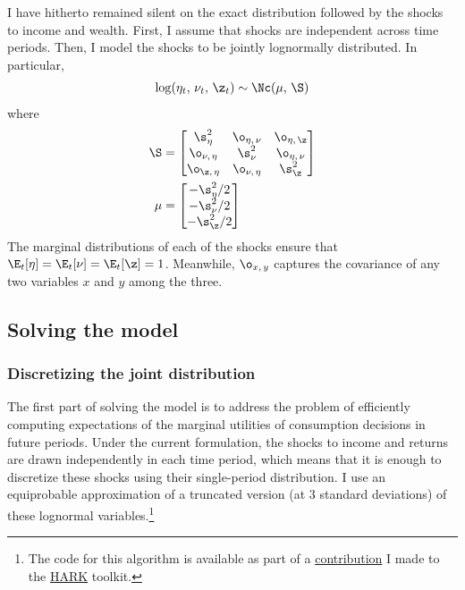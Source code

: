 I have hitherto remained silent on the exact distribution followed by the shocks to income and wealth. First, I assume that shocks are independent across time periods. Then, I model the shocks to be jointly lognormally distributed. In particular,
\begin{align*}
    \log (\eta_t,\,\nu_t,\,\z_t) \sim \Nc(\mu,\,\S)
\end{align*}
where
\begin{align*}
    \S &= \begin{bmatrix}
        \s_{\eta}^2 & \o_{\eta,\,\nu} & \o_{\eta,\,\z}\\
        \o_{\nu,\,\eta} & \s_{\nu}^2 & \o_{\eta,\,\nu}\\
        \o_{\z,\,\eta} & \o_{\nu,\,\eta} & \s_{\z}^2
    \end{bmatrix}\\
    \mu &= \begin{bmatrix}
        -\s_{\eta}^2 / 2\\
        -\s_{\nu}^2 / 2\\
        -\s_{\z}^2 / 2
    \end{bmatrix}
\end{align*}
The marginal distributions of each of the shocks ensure that $\E_t[\eta] = \E_t[\nu] = \E_t[\z] = 1$. Meanwhile, $\o_{x,\,y}$ captures the covariance of any two variables $x$ and $y$ among the three.

\subsection{Solving the model}

\subsubsection{Discretizing the joint distribution}\label{discretization}

The first part of solving the model is to address the problem of efficiently computing expectations of the marginal utilities of consumption decisions in future periods. Under the current formulation, the shocks to income and returns are drawn independently in each time period, which means that it is enough to discretize these shocks using their single-period distribution. I use an equiprobable approximation of a truncated version (at 3 standard deviations) of these lognormal variables.\footnote{The code for this algorithm is available as part of a \href{https://github.com/econ-ark/HARK/pull/1412}{contribution} I made to the \href{https://github.com/econ-ark/HARK}{HARK} toolkit.}


